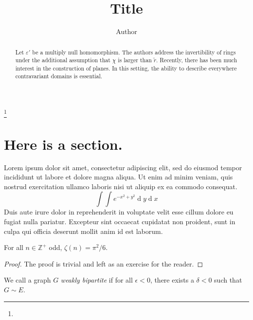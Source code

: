 \documentclass[11pt]{m2pi}
\begin{document}
\title[Short title]{Title}

 \author{Author}
\address{}
\email{}



\thanks{}

\begin{abstract}
 Let $\varepsilon'$ be a multiply null homomorphism.  The authors address the invertibility of rings under the additional assumption that $\chi$ is larger than $\tilde{r}$.  Recently, there has been much interest in the construction of planes. In this setting, the ability to describe everywhere contravariant domains is essential.
\end{abstract}

\maketitle
\section{Here is a section.}
Lorem ipsum dolor sit amet, consectetur adipiscing elit, sed do eiusmod tempor incididunt ut labore et dolore magna aliqua. Ut enim ad minim veniam, quis nostrud exercitation ullamco laboris nisi ut aliquip ex ea commodo consequat. 
\[\int\int e^{-x^2 + y^2} \operatorname{d}\!y \operatorname{d}\!x\]
Duis aute irure dolor in reprehenderit in voluptate velit esse cillum dolore eu fugiat nulla pariatur. Excepteur sint occaecat cupidatat non proident, sunt in culpa qui officia deserunt mollit anim id est laborum.
	

\begin{theorem}
For all $n\in \mathbb{Z}^{+}$ odd, $\zeta(n) = \pi^{2}/6.$
\end{theorem}

\begin{proof}
The proof is trivial and left as an exercise for the reader.
\end{proof}

\begin{definition}
We call a graph $G$ \emph{weakly bipartite} if for all $\epsilon < 0$, there exists a $\delta < 0$ such that $G \sim E$. 
\end{definition}
\end{document}
